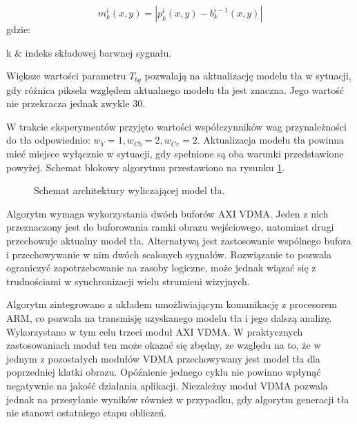 \begin{enumerate}
	\begin{equation}
	\label{eq:background-model-background-mask-2}
	m^i_k(x,y) = | p^i_k(x,y) - b^{i-1}_k(x,y)|
	\end{equation}
	gdzie:
	\begin{conditions}
		k & indeks składowej barwnej sygnału. \\ %
	\end{conditions}
	
	Większe wartości parametru $T_{bg}$ pozwalają na aktualizację modelu tła w sytuacji, gdy różnica piksela względem aktualnego modelu tła jest znaczna. 
	Jego wartość nie przekracza jednak zwykle $30$.
\end{enumerate}

W trakcie eksperymentów przyjęto wartości współczynników wag przynależności do tła odpowiednio: $w_Y=1, w_{Cb} = 2, w_{Cr} = 2$.
Aktualizacja modelu tła powinna mieć miejsce wyłącznie w sytuacji, gdy spełnione są oba warunki przedstawione powyżej.
Schemat blokowy algorytmu przestawiono na rysunku \ref{fig:background-model}.

\begin{figure}[h]
	\centering
	\def\svgwidth{\textwidth}
	
	\caption{Schemat architektury wyliczającej model tła.}
	\label{fig:background-model}
\end{figure}

Algorytm wymaga wykorzystania dwóch buforów AXI VDMA. 
Jeden z nich przeznaczony jest do buforowania ramki obrazu wejściowego, natomiast drugi przechowuje aktualny model tła. 
Alternatywą jest zastosowanie wspólnego bufora i przechowywanie w nim dwóch scalonych sygnałów. Rozwiązanie to pozwala ograniczyć zapotrzebowanie na zasoby logiczne, może jednak wiązać się z trudnościami w synchronizacji wielu strumieni wizyjnych.%

Algorytm zintegrowano z układem umożliwiającym komunikację z procesorem ARM, co pozwala na transmisję uzyskanego modelu tła i jego dalszą analizę. %
Wykorzystano w tym celu trzeci moduł AXI VDMA. %
W praktycznych zastosowaniach moduł ten może okazać się zbędny, ze względu na to, że w jednym z pozostałych modułów VDMA przechowywany jest model tła dla poprzedniej klatki obrazu. 
Opóźnienie jednego cyklu nie powinno wpłynąć negatywnie na jakość działania aplikacji. 
Niezależny moduł VDMA pozwala jednak na przesyłanie wyników również w przypadku, gdy algorytm generacji tła nie stanowi ostatniego etapu obliczeń.


